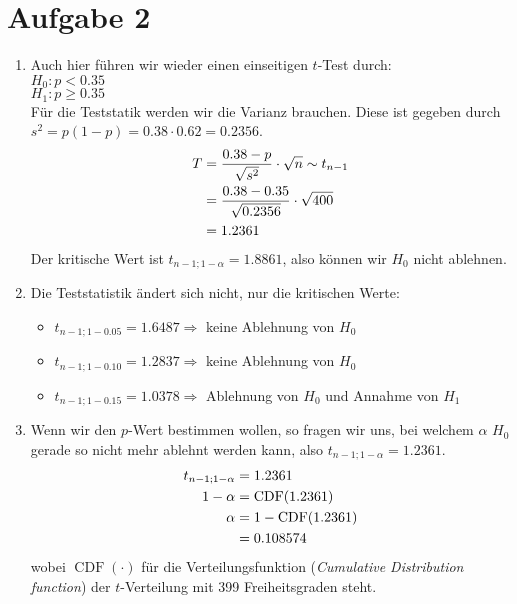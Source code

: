 \documentclass{article}
\DeclareMathOperator{\CDF}{CDF}
\begin{document}
	\section*{Aufgabe 2}
	\begin{enumerate}[label=(\alph*)]
		\item Auch hier führen wir wieder einen einseitigen $t$-Test durch: \\
		$H_0: p < 0.35$ \\
		$H_1: p \ge 0.35$ \\
		Für die Teststatik werden wir die Varianz brauchen. Diese ist gegeben durch $s^2= p(1-p) = 0.38\cdot 0.62 = 0.2356$.
		\begin{align}
			T &= \frac{0.38-p}{\sqrt{s^2}}\cdot\sqrt{n} \sim t_{n-1} \notag \\
			&= \frac{0.38-0.35}{\sqrt{0.2356}}\cdot\sqrt{400} \notag \\
			&= 1.2361 \notag
		\end{align}
		Der kritische Wert ist $t_{n-1;1-\alpha}=1.8861$, also können wir $H_0$ nicht ablehnen.
		\item Die Teststatistik ändert sich nicht, nur die kritischen Werte:
		\begin{itemize}
			\item $t_{n-1;1-0.05} = 1.6487 \Rightarrow$ keine Ablehnung von $H_0$
			\item $t_{n-1;1-0.10} = 1.2837 \Rightarrow$ keine Ablehnung von $H_0$
			\item $t_{n-1;1-0.15} = 1.0378 \Rightarrow$ Ablehnung von $H_0$ und Annahme von $H_1$
		\end{itemize}
		\item Wenn wir den $p$-Wert bestimmen wollen, so fragen wir uns, bei welchem $\alpha$ $H_0$ gerade so nicht mehr ablehnt werden kann, also $t_{n-1;1-\alpha}=1.2361$.
		\begin{align}
			t_{n-1;1-\alpha} &= 1.2361 \notag \\
			1-\alpha &= \CDF(1.2361) \notag \\
			\alpha &= 1-\CDF(1.2361) \notag \\
			&= 0.108574 \notag
		\end{align}
		wobei $\CDF(\cdot)$ für die Verteilungsfunktion (\textit{Cumulative Distribution function}) der $t$-Verteilung mit 399 Freiheitsgraden steht.
	\end{enumerate}
\end{document}
